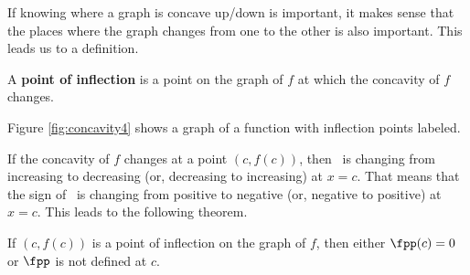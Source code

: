 %
%
%



If knowing where a graph is concave up/down is important, it makes sense that the places where the graph changes from one to the other is also important. This leads us to a definition.

{A \textbf{point of inflection} is a point on the graph of $f$ at which the concavity of $f$ changes.
}

Figure \ref{fig:concavity4} shows a graph of a function with inflection points labeled.


If the concavity of $f$ changes at a point $(c,f(c))$, then \fp\ is changing from increasing to decreasing (or, decreasing to increasing) at $x=c$. That means that the sign of \fpp\ is changing from positive to negative (or, negative to positive) at $x=c$.  This leads to the following theorem.

{If $(c,f(c))$ is a point of inflection on the graph of $f$, then either $\fpp(c)=0$ or $\fpp$ is not defined at $c$.}

